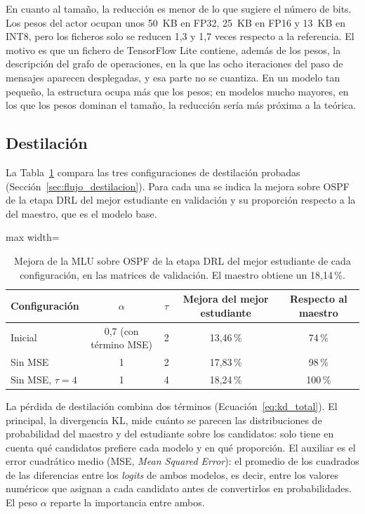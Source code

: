 En cuanto al tamaño, la reducción es menor de lo que sugiere el número de bits. Los pesos del actor ocupan unos 50~KB en FP32, 25~KB en FP16 y 13~KB en INT8, pero los ficheros solo se reducen 1,3 y 1,7 veces respecto a la referencia. El motivo es que un fichero de TensorFlow Lite contiene, además de los pesos, la descripción del grafo de operaciones, en la que las ocho iteraciones del paso de mensajes aparecen desplegadas, y esa parte no se cuantiza. En un modelo tan pequeño, la estructura ocupa más que los pesos; en modelos mucho mayores, en los que los pesos dominan el tamaño, la reducción sería más próxima a la teórica.

\subsection{Destilación}\label{sec:res_destilacion}

La Tabla~\ref{tab:res_destilacion} compara las tres configuraciones de destilación probadas (Sección~\ref{sec:flujo_destilacion}). Para cada una se indica la mejora sobre OSPF de la etapa DRL del mejor estudiante en validación y su proporción respecto a la del maestro, que es el modelo base.

\begin{table}[H]
	\centering
	\footnotesize
	\begin{adjustbox}{max width=\textwidth}
	\begin{tabular}{lcccc}
		\toprule
		\textbf{Configuración} & \textbf{$\alpha$} & \textbf{$\tau$} & \textbf{Mejora del mejor estudiante} & \textbf{Respecto al maestro} \\
		\midrule
		Inicial & 0,7 (con término MSE) & 2 & 13,46\,\% & 74\,\% \\
		Sin MSE & 1 & 2 & 17,83\,\% & 98\,\% \\
		Sin MSE, $\tau = 4$ & 1 & 4 & 18,24\,\% & 100\,\% \\
		\bottomrule
	\end{tabular}
	\end{adjustbox}
	\caption[Resultados de las configuraciones de destilación]{Mejora de la MLU sobre OSPF de la etapa DRL del mejor estudiante de cada configuración, en las matrices de validación. El maestro obtiene un 18,14\,\%.}
	\label{tab:res_destilacion}
\end{table}

La pérdida de destilación combina dos términos (Ecuación~\eqref{eq:kd_total}). El principal, la divergencia KL, mide cuánto se parecen las distribuciones de probabilidad del maestro y del estudiante sobre los candidatos: solo tiene en cuenta qué candidatos prefiere cada modelo y en qué proporción. El auxiliar es el error cuadrático medio (MSE, \textit{Mean Squared Error}): el promedio de los cuadrados de las diferencias entre los \textit{logits} de ambos modelos, es decir, entre los valores numéricos que asignan a cada candidato antes de convertirlos en probabilidades. El peso $\alpha$ reparte la importancia entre ambos.

